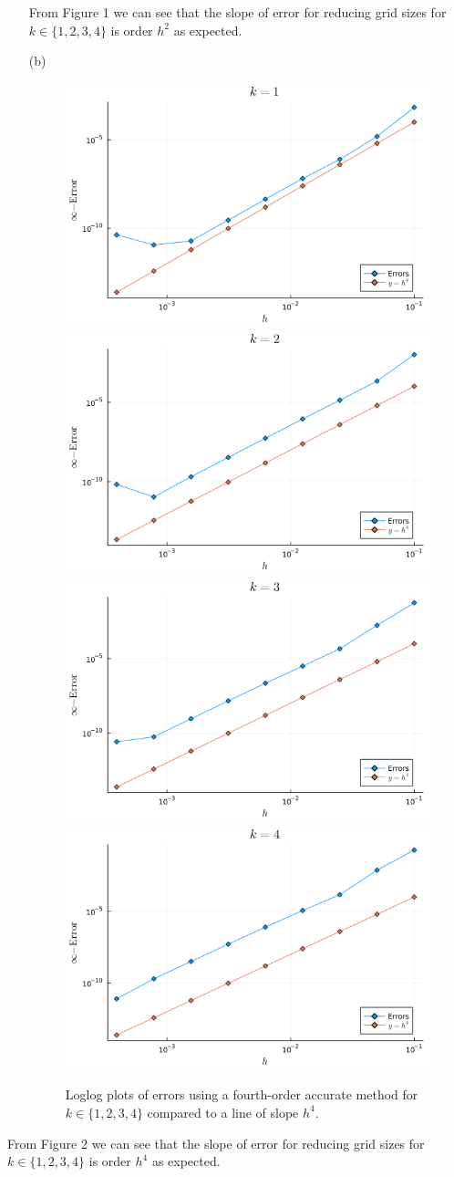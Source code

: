 \documentclass[12pt]{report}
\begin{document}
\begin{solution}
\begin{enumerate}
      From Figure 1 we can see that the slope of error for reducing grid sizes for $k \in \{1,2,3,4\}$ is order $h^2$ as expected. 

      \item [(b)]
      
      \begin{figure}[H]
        \centering
        \includegraphics[width=0.48\linewidth]{images/1b1.png}
        \includegraphics[width=0.48\linewidth]{images/2b1.png}
        \includegraphics[width=0.48\linewidth]{images/3b1.png}
        \includegraphics[width=0.48\linewidth]{images/4b1.png}
        \caption{Loglog plots of errors using a fourth-order accurate method for $k \in \{1,2,3,4\}$ compared to a line of slope $h^4$.}
      \end{figure}
    \end{enumerate}
    
    From Figure 2 we can see that the slope of error for reducing grid sizes for $k \in \{1,2,3,4\}$ is order $h^4$ as expected.

\end{solution}
\end{document}
